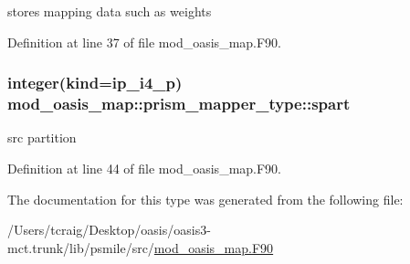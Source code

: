 stores mapping data such as weights 



Definition at line 37 of file mod\+\_\+oasis\+\_\+map.\+F90.

\hypertarget{structmod__oasis__map_1_1prism__mapper__type_a26d7374d018e7d5b5b87d91eef9e02a9}{
\subsubsection[{spart}]{\setlength{\rightskip}{0pt plus 5cm}integer(kind=ip\+\_\+i4\+\_\+p) mod\+\_\+oasis\+\_\+map\+::prism\+\_\+mapper\+\_\+type\+::spart\hspace{0.3cm}{\ttfamily [private]}}}\label{structmod__oasis__map_1_1prism__mapper__type_a26d7374d018e7d5b5b87d91eef9e02a9}


src partition 



Definition at line 44 of file mod\+\_\+oasis\+\_\+map.\+F90.



The documentation for this type was generated from the following file\+:\begin{DoxyCompactItemize}
\item 
/\+Users/tcraig/\+Desktop/oasis/oasis3-\/mct.\+trunk/lib/psmile/src/\hyperlink{mod__oasis__map_8_f90}{mod\+\_\+oasis\+\_\+map.\+F90}\end{DoxyCompactItemize}
